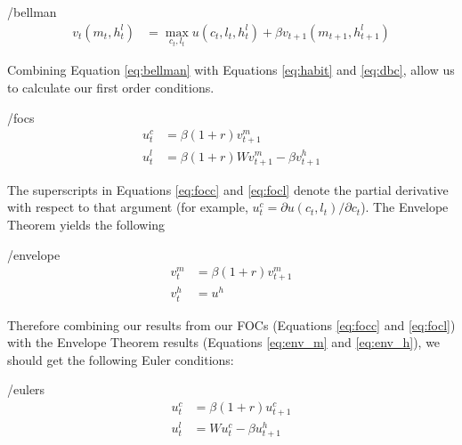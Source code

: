 \documentclass[ProjectMMD]{subfiles}
\begin{document}
\hypertarget{bellman}{}
\begin{verbatimwrite}{\EqDir/bellman}
  \begin{align}
    v_t(m_t, h_t^l) &= \max _{c_t, l_t}u(c_t, l_t, h_t^l) + \beta v_{t+1}(m_{t+1}, h_{t+1}^l) \label{eq:bellman}
  \end{align}
\end{verbatimwrite}

Combining Equation \eqref{eq:bellman} with Equations \eqref{eq:habit} and \eqref{eq:dbc}, allow us to calculate our first order conditions.


\hypertarget{focs}{}
\begin{verbatimwrite}{\EqDir/focs}
  \begin{align}
    u^c_t &=\beta(1+r)v_{t+1}^m \label{eq:focc} \\
    u^l_t &= \beta(1+r)W v_{t+1}^m - \beta v_{t+1}^h \label{eq:focl}
  \end{align}
\end{verbatimwrite}


The superscripts in Equations \eqref{eq:focc} and \eqref{eq:focl} denote the partial derivative with respect to that argument (for example, $u^c_t = \partial u(c_t,l_t) / \partial c_t$). The Envelope Theorem yields the following

\hypertarget{envelope}{}
\begin{verbatimwrite}{\EqDir/envelope}
  \begin{align}
    v_t^m &= \beta(1+r)v_{t+1}^m \label{eq:env_m} \\
    v_t^h &= u^h \label{eq:env_h}
  \end{align}
\end{verbatimwrite}

Therefore combining our results from our FOCs (Equations \eqref{eq:focc} and \eqref{eq:focl}) with the Envelope Theorem results (Equations \eqref{eq:env_m} and \eqref{eq:env_h}), we should get the following Euler conditions:

\hypertarget{eulers}{}
\begin{verbatimwrite}{\EqDir/eulers}
  \begin{align}
    u^c_t &= \beta(1+r)u^c_{t+1} \label{eq:euler_cons} \\
    u_t^l &= W u^c_t - \beta u^h_{t+1} \label{eq:euler_leisure}
  \end{align}
\end{verbatimwrite}


\end{document}
